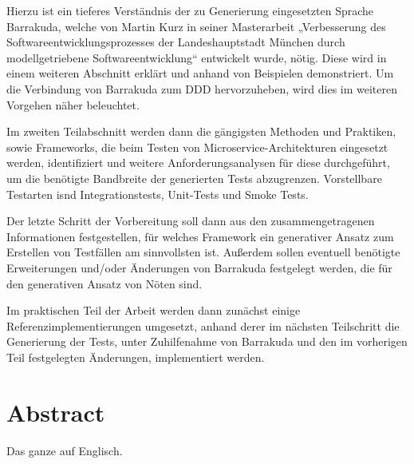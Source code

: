 \documentclass[12pt,a4paper,bibliography=totocnumbered,listof=totocnumbered]{scrartcl}
\begin{document}
Hierzu ist ein tieferes Verständnis der zu Generierung eingesetzten Sprache Barrakuda, welche von Martin Kurz in seiner Masterarbeit „Verbesserung des Softwareentwicklungsprozesses der Landeshauptstadt München durch modellgetriebene Softwareentwicklung“ entwickelt wurde, nötig. Diese wird in einem weiteren Abschnitt erklärt und anhand von Beispielen demonstriert. Um die Verbindung von Barrakuda zum DDD hervorzuheben, wird dies im weiteren Vorgehen näher beleuchtet.

Im zweiten Teilabschnitt werden dann die gängigsten Methoden und Praktiken, sowie Frameworks, die beim Testen von Microservice-Architekturen eingesetzt werden, identifiziert und weitere Anforderungsanalysen für diese durchgeführt, um die benötigte Bandbreite der generierten Tests abzugrenzen. Vorstellbare Testarten isnd Integrationstests, Unit-Tests und Smoke Tests.

Der letzte Schritt der Vorbereitung soll dann aus den zusammengetragenen Informationen festgestellen, für welches Framework ein generativer Ansatz zum Erstellen von Testfällen am sinnvollsten ist. Außerdem sollen eventuell benötigte Erweiterungen und/oder Änderungen von Barrakuda festgelegt werden, die für den generativen Ansatz von Nöten sind.

Im praktischen Teil der Arbeit werden dann zunächst einige Referenzimplementierungen umgesetzt, anhand derer im nächsten Teilschritt die Generierung der Tests, unter Zuhilfenahme von Barrakuda und den im vorherigen Teil festgelegten Änderungen, implementiert werden.

\vspace{-1,2em}
\section*{Abstract}
Das ganze auf Englisch.
\pagebreak

\renewcommand{\cfttabpresnum}{Tab. }
\renewcommand{\cftfigpresnum}{Abb. }
\settowidth{\cfttabnumwidth}{Abb. 10\quad}
\settowidth{\cftfignumwidth}{Abb. 10\quad}
\end{document}
